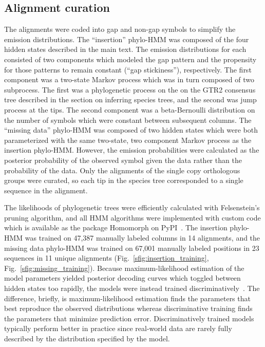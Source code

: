 \subsection{Alignment curation}
The alignments were coded into gap and non-gap symbols to simplify the emission distributions. The ``insertion'' phylo-HMM was composed of the four hidden states described in the main text. The emission distributions for each consisted of two components which modeled the gap pattern and the propensity for those patterns to remain constant (``gap stickiness''), respectively. The first component was a two-state Markov process which was in turn composed of two subprocess. The first was a phylogenetic process on the on the GTR2 consensus tree described in the section on inferring species trees, and the second was jump process at the tips. The second component was a beta-Bernoulli distribution on the number of symbols which were constant between subsequent columns. The ``missing data'' phylo-HMM was composed of two hidden states which were both parameterized with the same two-state, two component Markov process as the insertion phylo-HMM. However, the emission probabilities were calculated as the posterior probability of the observed symbol given the data rather than the probability of the data. Only the alignments of the single copy orthologous groups were curated, so each tip in the species tree corresponded to a single sequence in the alignment.

The likelihoods of phylogenetic trees were efficiently calculated with Felsenstein's pruning algorithm, and all HMM algorithms were implemented with custom code which is available as the package Homomorph on PyPI~\cite{Felsenstein1981}. The insertion phylo-HMM was trained on 47,387 manually labeled columns in 14 alignments, and the missing data phylo-HMM was trained on 67,001 manually labeled positions in 23 sequences in 11 unique alignments (Fig.~\ref{sfig:insertion_training}, Fig.~\ref{sfig:missing_training}). Because maximum-likelihood estimation of the model parameters yielded posterior decoding curves which toggled between hidden states too rapidly, the models were instead trained discriminatively~\cite{Krogh1999}. The difference, briefly, is maximum-likelihood estimation finds the parameters that best reproduce the observed distributions whereas discriminative training finds the parameters that minimize prediction error. Discriminatively trained models typically perform better in practice since real-world data are rarely fully described by the distribution specified by the model.

